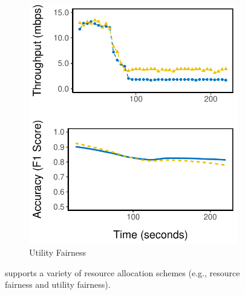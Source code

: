 \begin{figure}
\begin{subfigure}[t]{0.49\columnwidth}
    \includegraphics[width=\textwidth]{figures/multitask-eq-acc.pdf}
    \caption{Utility Fairness}
    \label{fig:eq-acc}
  \end{subfigure}
  \caption{\sysname{} supports a variety of resource allocation schemes (e.g., resource fairness and utility fairness).}
  \label{fig:multitask}
\end{figure}

